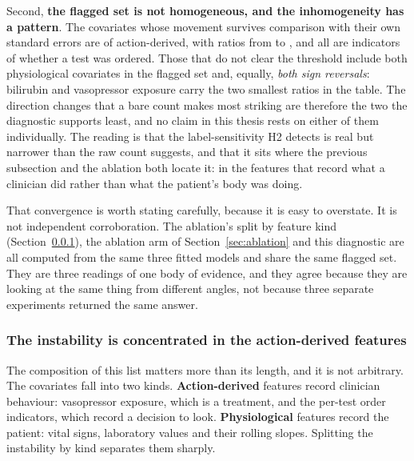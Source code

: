 Second, \textbf{the flagged set is not homogeneous, and the inhomogeneity has a
pattern}. The covariates whose movement survives comparison with their own
standard errors are \pcHTwoNRobustAction{} of \pcHTwoNRobust{} action-derived,
with ratios from \pcHTwoZMinRobust{} to \pcHTwoZMax, and all
\pcHTwoNRobust{} are indicators of whether a test was ordered. Those that do
not clear the threshold include both physiological covariates in the flagged
set and, equally, \emph{both sign reversals}: bilirubin and vasopressor
exposure carry the two smallest ratios in the table. The direction changes that
a bare count makes most striking are therefore the two the diagnostic supports
least, and no claim in this thesis rests on either of them individually. The
reading is that the label-sensitivity H2 detects is real but narrower than the
raw count suggests, and that it sits where the previous subsection and the
ablation both locate it: in the features that record what a clinician did
rather than what the patient's body was doing.

That convergence is worth stating carefully, because it is easy to overstate.
It is not independent corroboration. The ablation's split by feature kind
(Section~\ref{sec:h2_action}), the ablation arm of
Section~\ref{sec:ablation} and this diagnostic are all computed from the same
three fitted models and share the same flagged set. They are three readings of
one body of evidence, and they agree because they are looking at the same
thing from different angles, not because three separate experiments returned
the same answer.

\subsubsection{The instability is concentrated in the action-derived features}
\label{sec:h2_action}

The composition of this list matters more than its length, and it is not
arbitrary. The covariates fall into two kinds. \textbf{Action-derived}
features record clinician behaviour: vasopressor exposure, which is a
treatment, and the per-test order indicators, which record a decision to look.
\textbf{Physiological} features record the patient: vital signs, laboratory
values and their rolling slopes. Splitting the instability by kind separates
them sharply.

